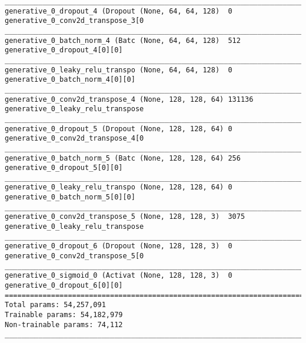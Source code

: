 \begin{lstlisting}[caption={CelebA-\ac{VLAE} Decoder},captionpos=b,basicstyle=\tiny, label={lst:celeba-vlae-decoder}]
__________________________________________________________________________________________________
generative_0_dropout_4 (Dropout (None, 64, 64, 128)  0           generative_0_conv2d_transpose_3[0
__________________________________________________________________________________________________
generative_0_batch_norm_4 (Batc (None, 64, 64, 128)  512         generative_0_dropout_4[0][0]
__________________________________________________________________________________________________
generative_0_leaky_relu_transpo (None, 64, 64, 128)  0           generative_0_batch_norm_4[0][0]
__________________________________________________________________________________________________
generative_0_conv2d_transpose_4 (None, 128, 128, 64) 131136      generative_0_leaky_relu_transpose
__________________________________________________________________________________________________
generative_0_dropout_5 (Dropout (None, 128, 128, 64) 0           generative_0_conv2d_transpose_4[0
__________________________________________________________________________________________________
generative_0_batch_norm_5 (Batc (None, 128, 128, 64) 256         generative_0_dropout_5[0][0]
__________________________________________________________________________________________________
generative_0_leaky_relu_transpo (None, 128, 128, 64) 0           generative_0_batch_norm_5[0][0]
__________________________________________________________________________________________________
generative_0_conv2d_transpose_5 (None, 128, 128, 3)  3075        generative_0_leaky_relu_transpose
__________________________________________________________________________________________________
generative_0_dropout_6 (Dropout (None, 128, 128, 3)  0           generative_0_conv2d_transpose_5[0
__________________________________________________________________________________________________
generative_0_sigmoid_0 (Activat (None, 128, 128, 3)  0           generative_0_dropout_6[0][0]
==================================================================================================
Total params: 54,257,091
Trainable params: 54,182,979
Non-trainable params: 74,112
__________________________________________________________________________________________________
\end{lstlisting}